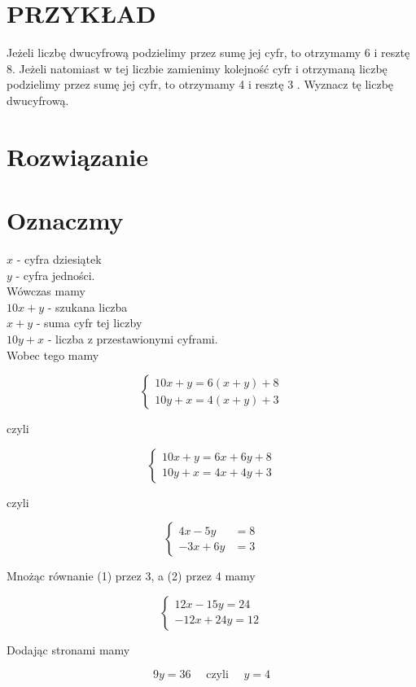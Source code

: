 \documentclass[10pt]{article}
\begin{document}
\section*{PRZYKŁAD}
Jeżeli liczbę dwucyfrową podzielimy przez sumę jej cyfr, to otrzymamy 6 i resztę 8. Jeżeli natomiast w tej liczbie zamienimy kolejność cyfr i otrzymaną liczbę podzielimy przez sumę jej cyfr, to otrzymamy 4 i resztę 3 . Wyznacz tę liczbę dwucyfrową.

\section*{Rozwiązanie}
\section*{Oznaczmy}
\(x\) - cyfra dziesiątek\\
\(y\) - cyfra jedności.\\
Wówczas mamy\\
\(10 x+y\) - szukana liczba\\
\(x+y\) - suma cyfr tej liczby\\
\(10 y+x\) - liczba z przestawionymi cyframi.\\
Wobec tego mamy

\[
\left\{\begin{array}{l}
10 x+y=6(x+y)+8 \\
10 y+x=4(x+y)+3
\end{array}\right.
\]

czyli

\[
\left\{\begin{array}{l}
10 x+y=6 x+6 y+8 \\
10 y+x=4 x+4 y+3
\end{array}\right.
\]

czyli

\[
\left\{\begin{aligned}
4 x-5 y & =8 \\
-3 x+6 y & =3
\end{aligned}\right.
\]

Mnożąc równanie (1) przez 3, a (2) przez 4 mamy

\[
\left\{\begin{array}{r}
12 x-15 y=24 \\
-12 x+24 y=12
\end{array}\right.
\]

Dodając stronami mamy

\[
9 y=36 \quad \text { czyli } \quad y=4
\]
\end{document}
